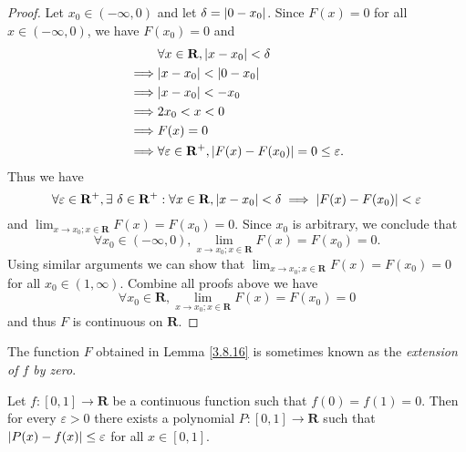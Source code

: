 \begin{proof}
    Let \(x_0 \in (-\infty, 0)\) and let \(\delta = \abs*{0 - x_0}\).
    Since \(F(x) = 0\) for all \(x \in (-\infty, 0)\), we have \(F(x_0) = 0\) and
    \begin{align*}
                 & \forall x \in \mathbf{R}, \abs*{x - x_0} < \delta                                \\
        \implies & \abs*{x - x_0} < \abs*{0 - x_0}                                                  \\
        \implies & \abs*{x - x_0} < -x_0                                                            \\
        \implies & 2x_0 < x < 0                                                                     \\
        \implies & F(x) = 0                                                                         \\
        \implies & \forall \varepsilon \in \mathbf{R}^+, \abs*{F(x) - F(x_0)} = 0 \leq \varepsilon.
    \end{align*}
    Thus we have
    \[
        \forall \varepsilon \in \mathbf{R}^+, \exists\ \delta \in \mathbf{R}^+ : \forall x \in \mathbf{R}, \abs*{x - x_0} < \delta \implies \abs*{F(x) - F(x_0)} < \varepsilon
    \]
    and \(\lim_{x \to x_0 ; x \in \mathbf{R}} F(x) = F(x_0) = 0\).
    Since \(x_0\) is arbitrary, we conclude that
    \[
        \forall x_0 \in (-\infty, 0), \lim_{x \to x_0 ; x \in \mathbf{R}} F(x) = F(x_0) = 0.
    \]
    Using similar arguments we can show that \(\lim_{x \to x_0 ; x \in \mathbf{R}} F(x) = F(x_0) = 0\) for all \(x_0 \in (1, \infty)\).
    Combine all proofs above we have
    \[
        \forall x_0 \in \mathbf{R}, \lim_{x \to x_0 ; x \in \mathbf{R}} F(x) = F(x_0) = 0
    \]
    and thus \(F\) is continuous on \(\mathbf{R}\).
\end{proof}

\begin{remark}\label{3.8.17}
    The function \(F\) obtained in Lemma \ref{3.8.16} is sometimes known as the \emph{extension of \(f\) by zero}.
\end{remark}

\begin{corollary}\label{3.8.18}
    Let \(f : [0, 1] \to \mathbf{R}\) be a continuous function such that \(f(0) = f(1) = 0\).
    Then for every \(\varepsilon > 0\) there exists a polynomial \(P : [0, 1] \to \mathbf{R}\) such that \(\abs*{P(x) - f(x)} \leq \varepsilon\) for all \(x \in [0, 1]\).
\end{corollary}

